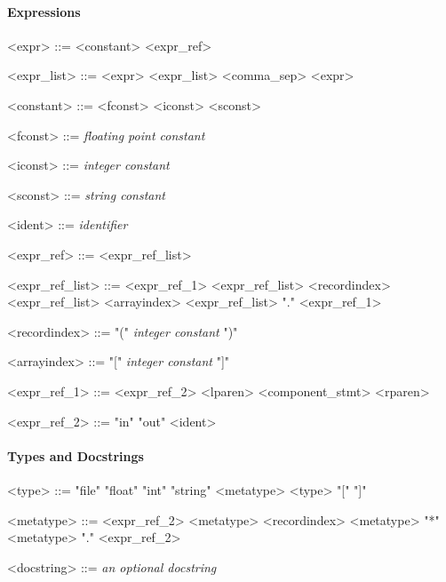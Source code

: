 \paragraph{Expressions}

\begin{grammar}
  <expr> ::= <constant>
  \alt <expr_ref>

  <expr_list> ::= <expr>
  \alt <expr_list> <comma_sep> <expr>

  <constant> ::= <fconst>
  \alt <iconst>
  \alt <sconst>

  <fconst> ::= \emph{floating point constant}

  <iconst> ::= \emph{integer constant}

  <sconst> ::= \emph{string constant}

  <ident> ::= \emph{identifier}


  <expr_ref> ::= <expr_ref_list>

  <expr_ref_list> ::= <expr_ref_1>
  \alt <expr_ref_list> <recordindex>
  \alt <expr_ref_list> <arrayindex>
  \alt <expr_ref_list> "." <expr_ref_1>

  <recordindex> ::= "(" \emph{integer constant} ")"

  <arrayindex> ::= "[" \emph{integer constant} "]"

  <expr_ref_1> ::= <expr_ref_2>
  \alt <lparen> <component_stmt> <rparen>

  <expr_ref_2> ::= "in"
  \alt "out"
  \alt <ident>
\end{grammar}


\paragraph{Types and Docstrings}

\begin{grammar}
  <type> ::= "file"
  \alt "float"
  \alt "int"
  \alt "string"
  \alt <metatype>
  \alt <type> "[" "]"

  <metatype> ::= <expr_ref_2>
  \alt <metatype> <recordindex>
  \alt <metatype> "*"
  \alt <metatype> "." <expr_ref_2>

  <docstring> ::= \emph{an optional docstring}
\end{grammar}


